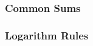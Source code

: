 \documentclass[twoside]{article}
\begin{document}
\subsubsection*{Common Sums}

\begin{multicols*}{2}
\end{multicols*}
\subsubsectionfont{\large\bfseries\sffamily\underline}
\subsubsection*{Logarithm Rules}

\begin{multicols*}{2}

\end{multicols*}
\end{document}

